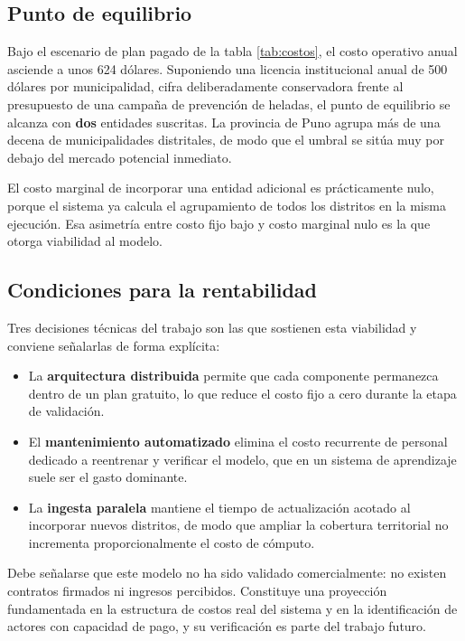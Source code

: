 \documentclass[conference]{IEEEtran}
\begin{document}
\subsection{Punto de equilibrio}

Bajo el escenario de plan pagado de la tabla \ref{tab:costos}, el costo
operativo anual asciende a unos 624 d\'olares. Suponiendo una licencia
institucional anual de 500 d\'olares por municipalidad, cifra deliberadamente
conservadora frente al presupuesto de una campa\~na de prevenci\'on de heladas,
el punto de equilibrio se alcanza con \textbf{dos} entidades suscritas. La provincia
de Puno agrupa m\'as de una decena de municipalidades distritales, de modo que
el umbral se sit\'ua muy por debajo del mercado potencial inmediato.

El costo marginal de incorporar una entidad adicional es pr\'acticamente nulo,
porque el sistema ya calcula el agrupamiento de todos los distritos en la misma
ejecuci\'on. Esa asimetr\'ia entre costo fijo bajo y costo marginal nulo es la
que otorga viabilidad al modelo.

\subsection{Condiciones para la rentabilidad}

Tres decisiones t\'ecnicas del trabajo son las que sostienen esta viabilidad y
conviene se\~nalarlas de forma expl\'icita:

\begin{itemize}
\item La \textbf{arquitectura distribuida} permite que cada componente permanezca
dentro de un plan gratuito, lo que reduce el costo fijo a cero durante la etapa
de validaci\'on.
\item El \textbf{mantenimiento automatizado} elimina el costo recurrente de personal
dedicado a reentrenar y verificar el modelo, que en un sistema de aprendizaje
suele ser el gasto dominante.
\item La \textbf{ingesta paralela} mantiene el tiempo de actualizaci\'on acotado al
incorporar nuevos distritos, de modo que ampliar la cobertura territorial no
incrementa proporcionalmente el costo de c\'omputo.
\end{itemize}

Debe se\~nalarse que este modelo no ha sido validado comercialmente: no existen
contratos firmados ni ingresos percibidos. Constituye una proyecci\'on
fundamentada en la estructura de costos real del sistema y en la identificaci\'on
de actores con capacidad de pago, y su verificaci\'on es parte del trabajo
futuro.
\end{document}
